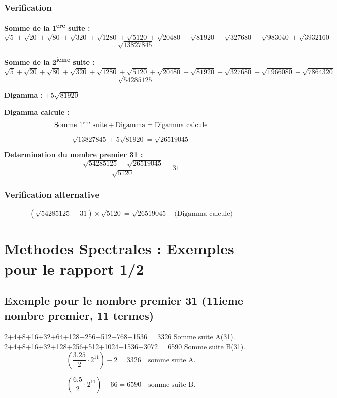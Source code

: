 \documentclass[a4paper,11pt]{article}
\begin{document}
\subsubsection{Verification}

\textbf{Somme de la 1\textsuperscript{ere} suite :}
\[
\sqrt{5} + \sqrt{20} + \sqrt{80} + \sqrt{320} + \sqrt{1280} + \sqrt{5120} + \sqrt{20480} + \sqrt{81920} + \sqrt{327680} + \sqrt{983040} + \sqrt{3932160}
\]
\[
= \sqrt{13827845}
\]

\textbf{Somme de la 2\textsuperscript{ieme} suite :}
\[
\sqrt{5} + \sqrt{20} + \sqrt{80} + \sqrt{320} + \sqrt{1280} + \sqrt{5120} + \sqrt{20480} + \sqrt{81920} + \sqrt{327680} + \sqrt{1966080} + \sqrt{7864320}
\]
\[
= \sqrt{54285125}
\]

\textbf{Digamma :} $+5\sqrt{81920}$

\textbf{Digamma calcule :}
\[
\text{Somme 1\textsuperscript{ere} suite} + \text{Digamma} = \text{Digamma calcule}
\]
\[
\sqrt{13827845} + 5\sqrt{81920} = \sqrt{26519045}
\]

\textbf{Determination du nombre premier 31 :}
\[
\frac{\sqrt{54285125} - \sqrt{26519045}}{\sqrt{5120}} = 31
\]

\subsubsection{Verification alternative}
\[
(\sqrt{54285125} - 31) \times \sqrt{5120} = \sqrt{26519045} \quad \text{(Digamma calcule)}
\]

\section*{Methodes Spectrales : Exemples pour le rapport 1/2}

\subsection*{Exemple pour le nombre premier 31 (11ieme nombre premier, 11 termes)}

2+4+8+16+32+64+128+256+512+768+1536 = 3326 Somme suite A(31).\\
2+4+8+16+32+128+256+512+1024+1536+3072 = 6590 Somme suite B(31).\\

\[
\left(\frac{3.25}{2} \cdot 2^{11}\right) - 2 = 3326 \quad \text{somme suite A.}
\]

\[
\left(\frac{6.5}{2} \cdot 2^{11}\right) - 66 = 6590 \quad \text{somme suite B.}
\]
\end{document}
